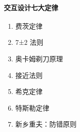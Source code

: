 \documentclass[letterpaper,11pt,english]{sphinxmanual}
\begin{document}
\paragraph{交互设计七大定律}
\label{\detokenize{chapter_idea/design:id2}}\begin{enumerate}
%
\item {} 
费茨定律

\item {} 
7±2 法则

\item {} 
奥卡姆剃刀原理

\item {} 
接近法则

\item {} 
希克定律

\item {} 
特斯勒定律

\item {} 
新乡重夫：防错原则

\end{enumerate}
\end{document}
